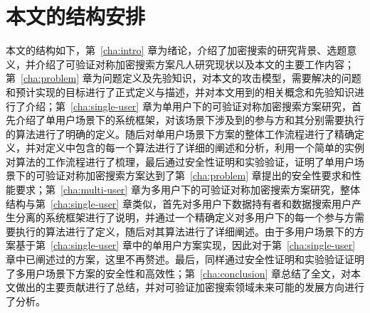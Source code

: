 \section{本文的结构安排}
本文的结构如下，第~\ref{cha:intro} 章为绪论，介绍了加密搜索的研究背景、选题意义，并介绍了可验证对称加密搜索方案凡人研究现状以及本文的主要工作内容；第~\ref{cha:problem} 章为问题定义及先验知识，对本文的攻击模型，需要解决的问题和预计实现的目标进行了正式定义与描述，并对本文用到的相关概念和先验知识进行了介绍；第~\ref{cha:single-user} 章为单用户下的可验证对称加密搜索方案研究，首先介绍了单用户场景下的系统框架，对该场景下涉及到的参与方和其分别需要执行的算法进行了明确的定义。随后对单用户场景下方案的整体工作流程进行了精确定义，并对定义中包含的每一个算法进行了详细的阐述和分析，利用一个简单的实例对算法的工作流程进行了梳理，最后通过安全性证明和实验验证，证明了单用户场景下的可验证对称加密搜索方案达到了第~\ref{cha:problem} 章提出的安全性要求和性能要求；第~\ref{cha:multi-user} 章为多用户下的可验证对称加密搜索方案研究，整体结构与第~\ref{cha:single-user} 章类似，首先对多用户下数据持有者和数据搜索用户产生分离的系统框架进行了说明，并通过一个精确定义对多用户下的每一个参与方需要执行的算法进行了定义，随后对其算法进行了详细阐述。由于多用户场景下的方案基于第~\ref{cha:single-user} 章中的单用户方案实现，因此对于第~\ref{cha:single-user} 章中已阐述过的方案，这里不再赘述。最后，同样通过安全性证明和实验验证证明了多用户场景下方案的安全性和高效性；第~\ref{cha:conclusion} 章总结了全文，对本文做出的主要贡献进行了总结，并对可验证加密搜索领域未来可能的发展方向进行了分析。
